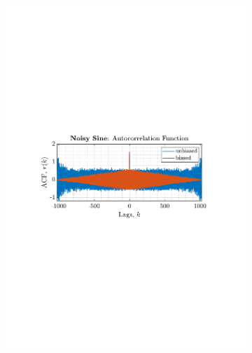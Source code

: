\documentclass[12pt]{article}
\begin{document}
	\begin{figure}[H]
		\centering
		\begin{subfigure}{0.49\textwidth}
			\centering
			\includegraphics[trim={2.2cm 11cm 3.15cm  11.2cm}, clip, width=\textwidth]{../MATLAB/figures/q1_3a_fig04.pdf} 
		\end{subfigure}
		\begin{subfigure}{0.49\textwidth}
			\centering

\end{subfigure}
\end{figure}
\end{document}
